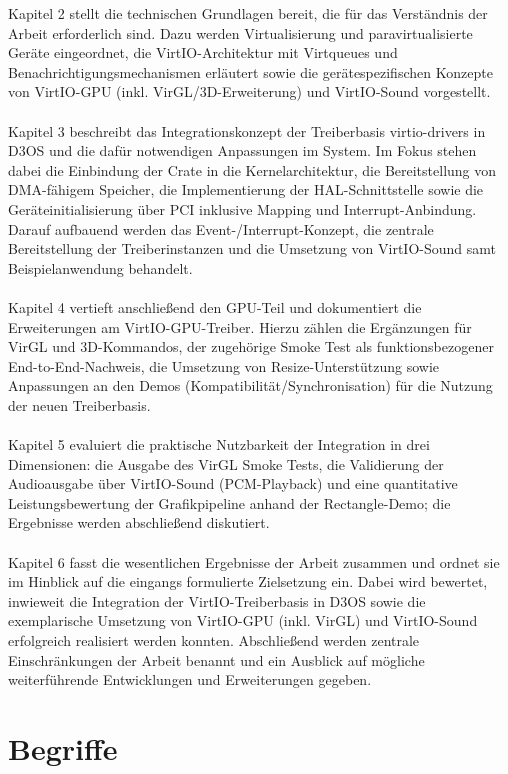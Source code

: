 Kapitel 2 stellt die technischen Grundlagen bereit, die für das Verständnis der Arbeit erforderlich sind. Dazu werden Virtualisierung und paravirtualisierte Geräte eingeordnet, die VirtIO-Architektur mit Virtqueues und Benachrichtigungsmechanismen erläutert sowie die gerätespezifischen Konzepte von VirtIO-GPU (inkl. VirGL/3D-Erweiterung) und VirtIO-Sound vorgestellt.\\
\\
Kapitel 3 beschreibt das Integrationskonzept der Treiberbasis virtio-drivers in D3OS und die dafür notwendigen Anpassungen im System. Im Fokus stehen dabei die Einbindung der Crate in die Kernelarchitektur, die Bereitstellung von DMA-fähigem Speicher, die Implementierung der HAL-Schnittstelle sowie die Geräteinitialisierung über PCI inklusive Mapping und Interrupt-Anbindung. Darauf aufbauend werden das Event-/Interrupt-Konzept, die zentrale Bereitstellung der Treiberinstanzen und die Umsetzung von VirtIO-Sound samt Beispielanwendung behandelt.\\
\\
Kapitel 4 vertieft anschließend den GPU-Teil und dokumentiert die Erweiterungen am VirtIO-GPU-Treiber. Hierzu zählen die Ergänzungen für VirGL und 3D-Kommandos, der zugehörige Smoke Test als funktionsbezogener End-to-End-Nachweis, die Umsetzung von Resize-Unterstützung sowie Anpassungen an den Demos (Kompatibilität/Synchronisation) für die Nutzung der neuen Treiberbasis.\\
\\
Kapitel 5 evaluiert die praktische Nutzbarkeit der Integration in drei Dimensionen: die Ausgabe des VirGL Smoke Tests, die Validierung der Audioausgabe über VirtIO-Sound (PCM-Playback) und eine quantitative Leistungsbewertung der Grafikpipeline anhand der Rectangle-Demo; die Ergebnisse werden abschließend diskutiert.\\
\\
Kapitel 6 fasst die wesentlichen Ergebnisse der Arbeit zusammen und ordnet sie im Hinblick auf die eingangs formulierte Zielsetzung ein. Dabei wird bewertet, inwieweit die Integration der VirtIO-Treiberbasis in D3OS sowie die exemplarische Umsetzung von VirtIO-GPU (inkl. VirGL) und VirtIO-Sound erfolgreich realisiert werden konnten. Abschließend werden zentrale Einschränkungen der Arbeit benannt und ein Ausblick auf mögliche weiterführende Entwicklungen und Erweiterungen gegeben.

\clearpage

\section{Begriffe}

